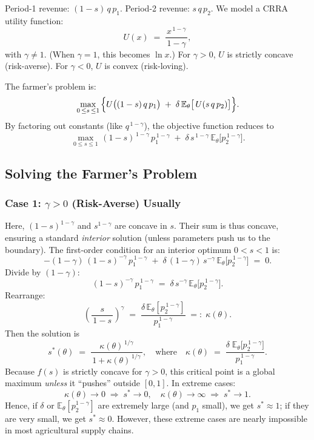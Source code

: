 \documentclass[12pt]{article}
\begin{document}
Period-1 revenue: \((1-s)\,q\,p_1\). 
Period-2 revenue: \(s\,q\,p_2\). 
We model a CRRA utility function:
\[
U(x) 
\;=\; 
\frac{x^{\,1-\gamma}}{\,1-\gamma\,},
\]
with \(\gamma \neq 1\). (When \(\gamma=1\), this becomes \(\ln x\).) For \(\gamma>0\), \(U\) is strictly concave (risk-averse). For \(\gamma<0\), \(U\) is convex (risk-loving).

The farmer's problem is:
\[
\max_{\,0 \,\le s \,\le 1\,}
\Bigl\{
U\bigl((1-s)\,q\,p_1\bigr)
\;+\;
\delta\,\mathbb{E}_\theta\bigl[\,U(s\,q\,p_2)\bigr]
\Bigr\}.
\]
By factoring out constants (like \(q^{\,1-\gamma}\)), the objective function reduces to
\[
\max_{\,0 \le s \le 1\,}
(1-s)^{\,1-\gamma}\,p_1^{\,1-\gamma}
\;+\;
\delta\,s^{\,1-\gamma}\,\mathbb{E}_\theta\bigl[p_2^{\,1-\gamma}\bigr].
\]

\subsection{Solving the Farmer's Problem}

\subsubsection{Case 1: \(\gamma>0\) (Risk-Averse) \quad Usually }

Here, \((1-s)^{1-\gamma}\) and \(s^{1-\gamma}\) are concave in \(s\). Their sum is thus concave, ensuring a standard \emph{interior} solution (unless parameters push us to the boundary). The first-order condition for an interior optimum \(0<s<1\) is:
\[
-(1-\gamma)\,(1-s)^{-\gamma}\,p_1^{\,1-\gamma}
\;+\;
\delta\,(1-\gamma)\,s^{-\gamma}\,\mathbb{E}_\theta\bigl[p_2^{\,1-\gamma}\bigr]
\;=\;0.
\]
Divide by \((1-\gamma)\):
\[
(1-s)^{-\gamma}\,p_1^{\,1-\gamma}
\;=\;
\delta\,s^{-\gamma}\,\mathbb{E}_\theta\bigl[p_2^{\,1-\gamma}\bigr].
\]
Rearrange:
\[
\left(\frac{s}{\,1-s\,}\right)^{\!\gamma}
\;=\;
\frac{\delta\,\mathbb{E}_\theta[p_2^{\,1-\gamma}]}{\,p_1^{\,1-\gamma}\,}
\;=:\;\kappa(\theta).
\]
Then the solution is
\[
s^*(\theta)
\;=\;
\frac{\kappa(\theta)^{\,1/\gamma}}
     {\,1 + \kappa(\theta)^{\,1/\gamma}\,},
\quad\text{where}\quad
\kappa(\theta)
\;=\;
\frac{\delta\;\mathbb{E}_\theta\bigl[p_2^{\,1-\gamma}\bigr]}{p_1^{\,1-\gamma}}.
\]
Because \(f(s)\) is strictly concave for \(\gamma>0\), this critical point is a global maximum \emph{unless} it ``pushes'' outside \([0,1]\). In extreme cases:
\[
\kappa(\theta)\to 0 \;\Longrightarrow\; s^*\to 0,
\quad
\kappa(\theta)\to \infty \;\Longrightarrow\; s^*\to 1.
\]
Hence, if \(\delta\) or \(\mathbb{E}_\theta[p_2^{1-\gamma}]\) are extremely large (and \(p_1\) small), we get $s^*\approx 1$; if they are very small, we get $s^*\approx 0$. However, these extreme cases are nearly impossible in most agricultural supply chains. 
\end{document}
